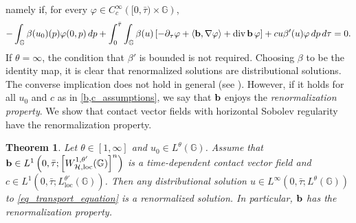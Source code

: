 \documentclass[11pt]{amsart}
\newcommand{\hhh}{{\mathcal{H}}}
\newcommand{\bb}{{\bf {b}}} %
\DeclareMathOperator{\divv}{div}
\theoremstyle{plain}
\newtheorem{theorem}{Theorem}[section]
\theoremstyle{definition}
\theoremstyle{remark}
\numberwithin{equation}{section}
\begin{document}
namely if, for every $\varphi\in C^\infty_c\left([0,\bar\tau)\times\mathbb{G}\right)$,
\begin{equation*}
    -\int_{\mathbb{G}}\beta(u_0)(p)\varphi(0,p)\,dp
    +\int_{0}^{\bar{\tau}}\int_{\mathbb{G}}\beta(u)\left[-\partial_\tau \varphi+\left\langle \bb, \nabla \varphi\right \rangle+\divv \bb\,\varphi\right]+c u\beta'(u)\varphi\,dp\,d\tau =0.
\end{equation*}
If $\theta=\infty$, the condition that $\beta'$ is bounded is not required. Choosing $\beta$ to be the identity map, it is clear that renormalized solutions are distributional solutions. The converse implication does not hold in general (see \cite{DePauw_03}). However, if it holds for all $u_0$ and $c$ as in \eqref{b,c_assumptions}, we say that $\bb$ enjoys the \emph{renormalization property}. We show that contact vector fields with horizontal Sobolev regularity have the renormalization property.
\begin{theorem} \label{teo_distributional_implies_renormalized}
Let $\theta \in [1,\infty]$ and $u_0 \in L^\theta(\mathbb{G})$. Assume that $\bb \in L^1\left(0,\bar{\tau};\left[W^{1,\theta'}_{\hhh,\mathrm{loc}}(\mathbb{G})\right]^n\right)$ is a time-dependent contact vector field and $c \in L^1\left(0,\bar{\tau};L^{\theta'}_{\mathrm{loc}}(\mathbb{G})\right)$. Then any distributional solution $u \in L^\infty\left(0,\bar{\tau};L^\theta(\mathbb{G})\right)$ to \eqref{eq_transport_equation} 
is a renormalized solution. In particular, $\bb$ has the renormalization property.
\end{theorem}
\end{document}
